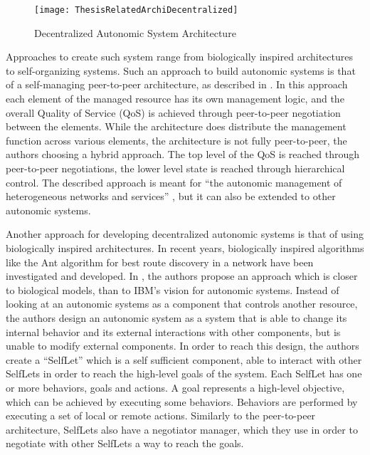 \begin{figure}
	\centering
		\texttt{[image: ThesisRelatedArchiDecentralized]}
	\caption{Decentralized Autonomic System Architecture}
	\label{fig:decentrarchi}
\end{figure}

Approaches to create such system range from biologically inspired architectures to self-organizing systems. Such an approach to build autonomic systems is that of a self-managing peer-to-peer architecture, as described in \cite{related:architecture:selfmanagep2p}. In this approach each element of the managed resource has its own management logic, and the overall Quality of Service (QoS) is achieved through peer-to-peer negotiation between the elements. While the architecture does distribute the management function across various elements, the architecture is not fully peer-to-peer, the authors choosing a hybrid approach. The top level of the QoS is reached through peer-to-peer negotiations, the lower level state is reached through hierarchical control. The described approach is meant for ``the autonomic management of heterogeneous networks and services'' \cite{related:architecture:selfmanagep2p}, but it can also be extended to other autonomic systems.

Another approach for developing decentralized autonomic systems is that of using biologically inspired architectures. In recent years, biologically inspired algorithms like the Ant algorithm \cite{antalgorithm} for best route discovery in a network have been investigated and developed. In \cite{related:architecture:selflet}, the authors propose an approach which is closer to biological models, than to IBM's vision for autonomic systems. Instead of looking at an autonomic systems as a component that controls another resource, the authors design an autonomic system as a system that is able to change its internal behavior and its external interactions with other components, but is unable to modify external components. In order to reach this design, the authors create a ``SelfLet'' which is a self sufficient component, able to interact with other SelfLets in order to reach the high-level goals of the system. Each SelfLet has one or more behaviors, goals and actions. A goal represents a high-level objective, which can be achieved by executing some behaviors. Behaviors are performed by executing a set of local or remote actions. Similarly to the peer-to-peer architecture, SelfLets also have a negotiator manager, which they use in order to negotiate with other SelfLets a way to reach the goals.

